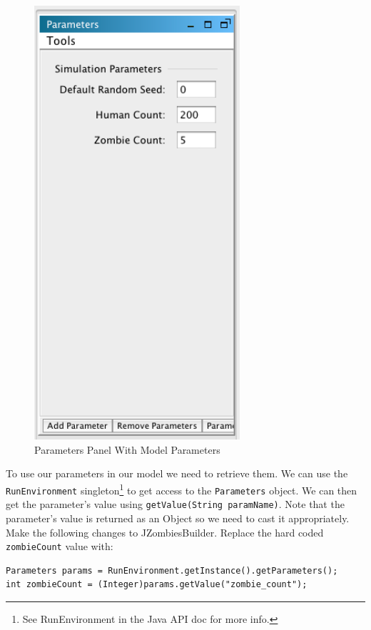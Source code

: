 \documentclass[11pt]{amsart}
\begin{document}
\begin{figure}[h]
\begin{center}
\vspace{.2in}
\centerline {
\includegraphics[width=3in]{GettingStartedImages/params2.png}
}
\caption{Parameters Panel With Model Parameters}
\label{fig:params2}
\end{center}
\end{figure}

To use our parameters in our model we need to retrieve them. We can use the \texttt{RunEnvironment} singleton\footnote{See RunEnvironment in the Java API doc for more info.} to get access to the \texttt{Parameters} object. We can then get the parameter's value using \texttt{getValue(String paramName)}. Note that the parameter's value is returned as an Object so we need to cast it appropriately. Make the following changes to JZombiesBuilder.  Replace the hard coded \texttt{zombieCount} value with:

\noindent\begin{minipage}[h]{\textwidth}
\vspace{.2in}
\lstset{language=java,caption=}
\begin{lstlisting}
Parameters params = RunEnvironment.getInstance().getParameters();
int zombieCount = (Integer)params.getValue("zombie_count");
\end{lstlisting}
\vspace{.2in}
\end{minipage}
\end{document}
